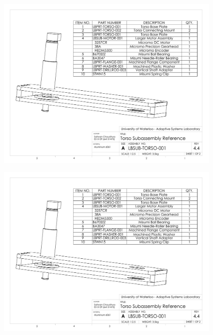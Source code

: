 \begin{figure}[!h]
	\begin{center}
    \includegraphics[scale=0.72,angle=90]{fig/drawings/lbsub-torso-001.pdf}
	\end{center}
\end{figure}

\begin{figure}[!h]
	\begin{center}
    \includegraphics[scale=0.72,angle=90,page=2]{fig/drawings/lbsub-torso-001.pdf}
	\end{center}
\end{figure}

